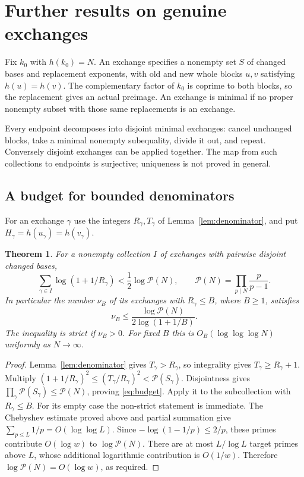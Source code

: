 \documentclass[11pt,a4paper]{article}
\newtheorem{theorem}{Theorem}[section]
\theoremstyle{remark}
\newcommand{\PP}{\mathcal P}
\begin{document}
\section{Further results on genuine exchanges}
Fix $k_0$ with $h(k_0)=N$. An exchange specifies a nonempty set $S$ of changed
bases and replacement exponents, with old and new whole blocks $u,v$ satisfying
$h(u)=h(v)$. The complementary factor of $k_0$ is coprime to both blocks,
so the replacement gives an actual preimage. An exchange is minimal if no
proper nonempty subset with those same replacements is an exchange.

Every endpoint decomposes into disjoint minimal exchanges: cancel unchanged
blocks, take a minimal nonempty subequality, divide it out, and repeat.
Conversely disjoint exchanges can be applied together. The map from such
collections to endpoints is surjective; uniqueness is not proved in general.

\subsection{A budget for bounded denominators}
For an exchange $\gamma$ use the integers $R_\gamma,T_\gamma$ of
Lemma~\ref{lem:denominator}, and put $H_\gamma=h(u_\gamma)=h(v_\gamma)$.

\begin{theorem}\label{thm:budget}
For a nonempty collection $I$ of exchanges with pairwise disjoint changed
bases,
\begin{equation}\label{eq:budget}
 \sum_{\gamma\in I}\log(1+1/R_\gamma)<\frac12\log\PP(N),
 \qquad \PP(N)=\prod_{p\mid N}\frac p{p-1}.
\end{equation}
In particular the number $\nu_B$ of its exchanges with $R_\gamma\le B$,
where $B\ge1$, satisfies
\[
 \nu_B\le\frac{\log\PP(N)}{2\log(1+1/B)}.
\]
The inequality is strict if $\nu_B>0$. For fixed $B$ this is
$O_B(\log\log\log N)$ uniformly as $N\to\infty$.
\end{theorem}
\begin{proof}
Lemma~\ref{lem:denominator} gives $T_\gamma>R_\gamma$, so integrality gives
$T_\gamma\ge R_\gamma+1$. Multiply
$(1+1/R_\gamma)^2\le(T_\gamma/R_\gamma)^2<\PP(S_\gamma)$.
Disjointness gives $\prod_\gamma\PP(S_\gamma)\le\PP(N)$, proving
\eqref{eq:budget}. Apply it to the subcollection with $R_\gamma\le B$.
For its empty case the non-strict statement is immediate.
The Chebyshev estimate proved above and partial summation give
$\sum_{p\le L}1/p=O(\log\log L)$. Since
$-\log(1-1/p)\le2/p$, these primes contribute $O(\log w)$ to
$\log\PP(N)$. There are at most $L/\log L$ target primes above $L$,
whose additional logarithmic contribution is $O(1/w)$. Therefore
$\log\PP(N)=O(\log w)$, as required.
\end{proof}
\end{document}
